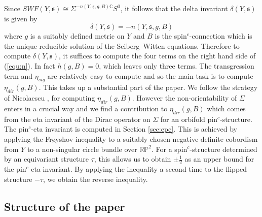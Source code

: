 \documentclass{amsart}
\theoremstyle{definition}
\theoremstyle{remark}
\numberwithin{equation}{section}
\begin{document}
Since $SWF(Y , \mathfrak{s}) \cong \Sigma^{-n(Y,\mathfrak{s},g,B) \mathbb{C}} S^0$, it follows that the delta invariant $\delta(Y , \mathfrak{s})$ is given by
\[
\delta(Y , \mathfrak{s}) = -n(Y , \mathfrak{s} , g , B)
\]
where $g$ is a suitably defined metric on $Y$ and $B$ is the spin$^c$-connection which is the unique reducible solution of the Seiberg--Witten equations. Therefore to compute $\delta(Y , \mathfrak{s})$, it suffices to compute the four terms on the right hand side of (\ref{equ:n}). In fact $h(g,B) = 0$, which leaves only three terms. The transgression term and $\eta_{sig}$ are relatively easy to compute and so the main task is to compute $\eta_{dir}(g,B)$. This takes up a substantial part of the paper. We follow the strategy of Nicolaescu \cite{nic}, \cite{nic2} for computing $\eta_{dir}(g,B)$. However the non-orientability of $\Sigma$ enters in a crucial way and we find a contribution to $\eta_{dir}(g,B)$ which comes from the eta invariant of the Dirac operator on $\Sigma$ for an orbifold pin$^c$-structure. The pin$^c$-eta invariant is computed in Section \ref{sec:epc}. This is achieved by applying the Frøyshov inequality to a suitably chosen negative definite cobordism from $Y$ to a  non-singular circle bundle over $\mathbb{RP}^2$. For a spin$^c$-structure determined by an equivariant structure $\tau$, this allows us to obtain $\pm \frac 12$ as an upper bound for the pin$^c$-eta invariant. By applying the  inequality a second time to the flipped structure $-\tau$, we obtain the reverse inequality.

\subsection{Structure of the paper}
\end{document}
